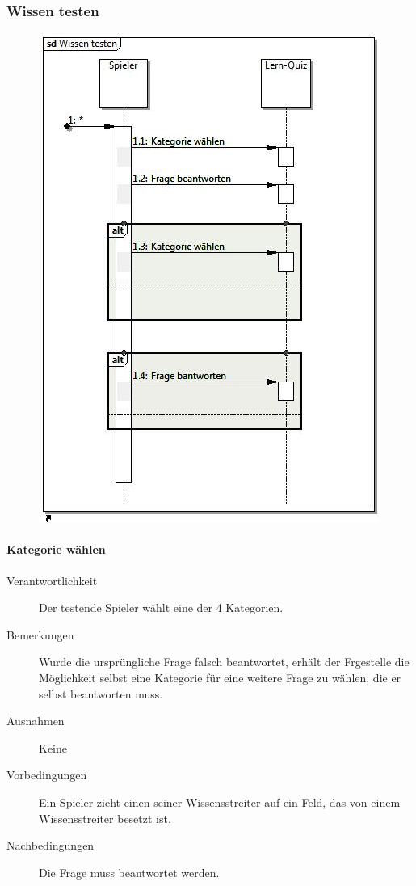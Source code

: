 \documentclass{report}
\begin{document}
\subsubsection{Wissen testen}
\begin{figure}[H]
	\includegraphics[width=\textwidth]{Diagramme/SequenceDiagram-WissenTesten.jpg}
	\centering
\end{figure}

\paragraph{Kategorie wählen}
\begin{description}
	\item[Verantwortlichkeit] Der testende Spieler wählt eine der 4 Kategorien.
	\item[Bemerkungen] Wurde die ursprüngliche Frage falsch beantwortet, erhält der Frgestelle die Möglichkeit selbst eine Kategorie für eine weitere Frage zu wählen, die er selbst beantworten muss.
	\item[Ausnahmen] Keine
	\item[Vorbedingungen] Ein Spieler zieht einen seiner Wissensstreiter auf ein Feld, das von einem Wissensstreiter besetzt ist.
	\item[Nachbedingungen] Die Frage muss beantwortet werden.
\end{description}
\end{document}
